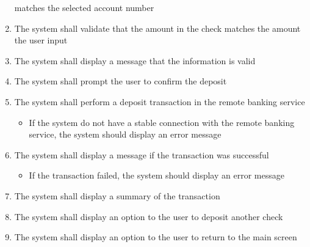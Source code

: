 \begin{enumerate}
    matches the selected account number
    \item The system shall validate that the amount in the check matches the 
    amount the user input
    \item The system shall display a message that the information is valid
    \item The system shall prompt the user to confirm the deposit
    \item The system shall perform a deposit transaction in the remote banking 
    service
    \begin{itemize}
        \item If the system do not have a stable connection with the remote 
        banking service, the system should display an error message
    \end{itemize}
    \item The system shall display a message if the transaction was successful
    \begin{itemize}
        \item If the transaction failed, the system should display an error 
        message
    \end{itemize}	
    \item The system shall display a summary of the transaction
    \item The system shall display an option to the user to deposit another 
    check
    \item The system shall display an option to the user to return to the main 
    screen
\end{enumerate}